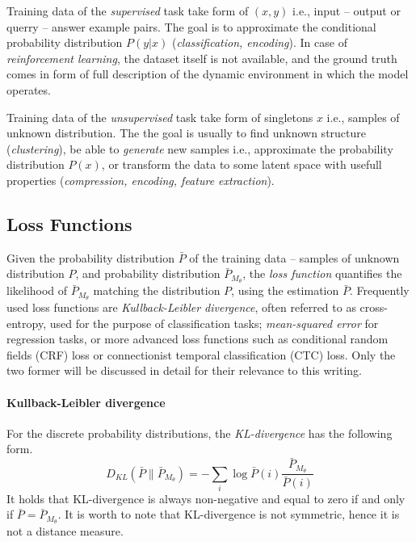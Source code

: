 Training data of the \emph{supervised} task take form of $(x,y)$ i.e., input -- output or querry -- answer example pairs. The goal is to approximate the conditional probability distribution $P(y|x)$ (\emph{classification, encoding}). In case of \emph{reinforcement learning}, the dataset itself is not available, and the ground truth comes in form of full description of the dynamic environment in which the model operates.

Training data of the \emph{unsupervised} task take form of singletons $x$ i.e., samples of unknown distribution. The the goal is usually to find unknown structure (\emph{clustering}), be able to \emph{generate} new samples i.e., approximate the probability distribution $P(x)$, or transform the data to some latent space with usefull properties (\emph{compression, encoding, feature extraction}).

\subsection{Loss Functions}
\label{sec:loss_fnc}

Given the probability distribution $\bar{P}$ of the training data -- samples of unknown distribution $P$, and probability distribution $\bar{P}_{M_\theta}$, the \emph{loss function} quantifies the likelihood of $\bar{P}_{M_\theta}$ matching the distribution $P$, using the estimation $\bar{P}$. Frequently used loss functions are \emph{Kullback-Leibler divergence}, often referred to as cross-entropy, used for the purpose of classification tasks; \emph{mean-squared error} for regression tasks, or more advanced loss functions such as conditional random fields (CRF) loss or connectionist temporal classification (CTC) loss. Only the two former will be discussed in detail for their relevance to this writing.

\paragraph{Kullback-Leibler divergence}
For the discrete probability distributions, the \emph{KL-divergence} has the following form.
\begin{equation} \label{eqn:kl_divergence}
D_{KL}(\bar{P} \parallel \bar{P}_{M_\theta}) = - \sum\limits_{i} \log \bar{P}(i)\frac{\bar{P}_{M_\theta}}{\bar{P}(i)}
\end{equation}
It holds that KL-divergence is always non-negative and equal to zero if and only if $\bar{P} = \bar{P}_{M_\theta}$. It is worth to note that KL-divergence is not symmetric, hence it is not a distance measure.

